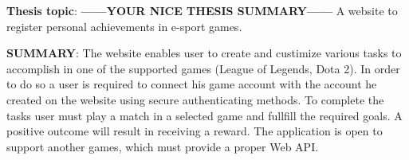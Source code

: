 \textbf{Thesis topic}: \textbf{------YOUR NICE THESIS SUMMARY------}  A website to register personal achievements in e-sport games.\par
\textbf{SUMMARY}: The website enables user to create and custimize various tasks to accomplish in one of the supported games (League of Legends, Dota 2). In order to do so a user is required to connect his game account with the account he created on the website using secure authenticating methods. To complete the tasks user must play a match in a selected game and fullfill the required goals. A positive outcome will result in receiving a reward. The application is open to support another games, which must provide a proper Web API.